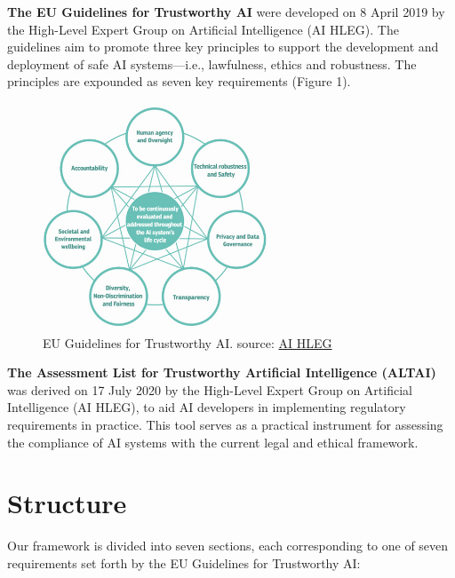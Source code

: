 \documentclass[
  letterpaper,
  DIV=11,
  numbers=noendperiod]{scrreport}
\begin{document}
\textbf{The EU Guidelines for Trustworthy AI} were developed on 8 April
2019 by the High-Level Expert Group on Artificial Intelligence (AI
HLEG). The guidelines aim to promote three key principles to support the
development and deployment of safe AI systems---i.e., lawfulness, ethics
and robustness. The principles are expounded as seven key requirements
(Figure 1).

\begin{figure}

{\centering \includegraphics[width=0.6\textwidth,height=\textheight]{eu_req.jpg}

}

\caption{EU Guidelines for Trustworthy AI. source:
\href{https://digital-strategy.ec.europa.eu/en/library/ethics-guidelines-trustworthy-ai}{AI
HLEG}}

\end{figure}

\textbf{The Assessment List for Trustworthy Artificial Intelligence
(ALTAI)} was derived on 17 July 2020 by the High-Level Expert Group on
Artificial Intelligence (AI HLEG), to aid AI developers in implementing
regulatory requirements in practice. This tool serves as a practical
instrument for assessing the compliance of AI systems with the current
legal and ethical framework.

\hypertarget{structure}{%
\section*{Structure}\label{structure}}


Our framework is divided into seven sections, each corresponding to one
of seven requirements set forth by the EU Guidelines for Trustworthy AI:
\end{document}
